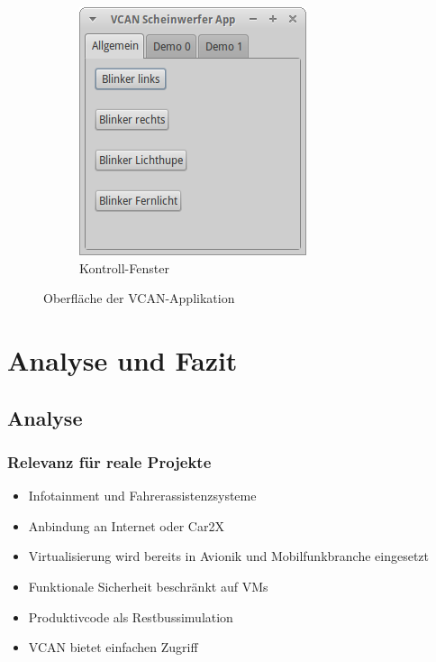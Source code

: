 \documentclass[]{beamer}
\begin{document}
\begin{frame}
\begin{figure}
\begin{subfigure}[b]{0.39\textwidth}
            \includegraphics[width=\textwidth]{vcan_app_control}
            \caption{Kontroll-Fenster}
            \label{fig:vcan_app_control}
        \end{subfigure}
        \caption{Oberfläche der VCAN-Applikation}
        \label{fig:vcan_app}
    \end{figure}
\end{frame}





\section{Analyse und Fazit}
\label{sec:analyse_fazit}

\subsection{Analyse}
\begin{frame}
\frametitle{Relevanz für reale Projekte}
    \begin{itemize}
        \item Infotainment und Fahrerassistenzsysteme
        \item Anbindung an Internet oder Car2X
        \item Virtualisierung wird bereits in Avionik und Mobilfunkbranche eingesetzt
        \item Funktionale Sicherheit beschränkt auf VMs
        \item Produktivcode als Restbussimulation
        \item VCAN bietet einfachen Zugriff
    \end{itemize}
\end{frame}
\end{document}
